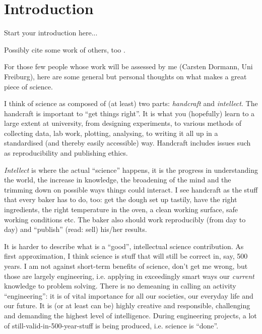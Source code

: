\chapter{Introduction}
\label{ch:introduction}


Start your introduction here...

Possibly cite some work of others, too \citep{Adiku.ea:1995:USO}.

%

\bigskip
\noindent For those few people whose work will be assessed by me (Carsten Dormann, Uni Freiburg), here are some general but personal thoughts on what makes a great piece of science.

I think of science as composed of (at least) two parts: \emph{handcraft} and \emph{intellect}. The handcraft is important to ``get things right''. It is what you (hopefully) learn to a large extent at university, from designing experiments, to various methods of collecting data, lab work, plotting, analysing, to writing it all up in a standardised (and thereby easily accessible) way. Handcraft includes issues such as reproducibility and publishing ethics.

\emph{Intellect} is where the actual ``science'' happens, it is the progress in understanding the world, the increase in knowledge, the broadening of the mind and the trimming down on possible ways things could interact. I see handcraft as the stuff that every baker has to do, too: get the dough set up tastily, have the right ingredients, the right temperature in the oven, a clean working surface, safe working conditions etc. The baker also should work reproducibly (from day to day) and ``publish'' (read: sell) his/her results.

It is harder to describe what is a ``good'', intellectual science contribution. As first approximation, I think science is stuff that will still be correct in, say, 500 years. I am not against short-term benefits of science, don't get me wrong, but those are largely engineering, i.e. applying in exceedingly smart ways our \emph{current} knowledge to problem solving. There is no demeaning in calling an activity ``engineering'': it is of vital importance for all our societies, our everyday life and our future. It is (or at least can be) highly creative and responsible, challenging and demanding the highest level of intelligence. During engineering projects, a lot of still-valid-in-500-year-stuff is being produced, i.e. science is ``done''. 

